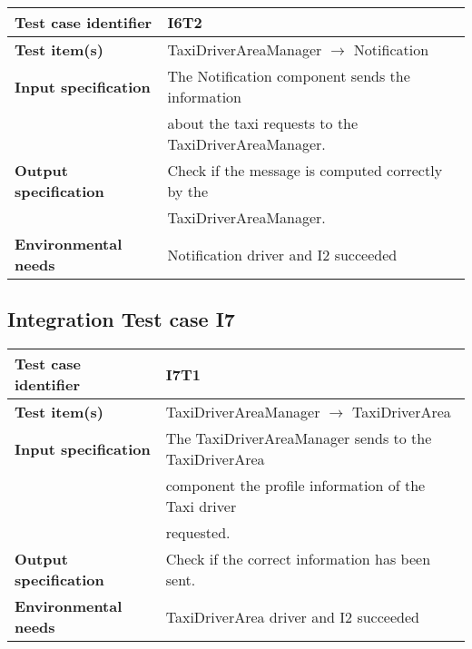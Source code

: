 		\vspace{1cm}
		\noindent
		\begin{adjustbox}{max width=\textwidth}
			\begin{tabular}{ l l}
				\hline 		\textbf{Test case identifier} & I6T2 \\
				\hline		\textbf{Test item(s)} & TaxiDriverAreaManager $\rightarrow$ Notification \\
				\hline		\textbf{Input specification} & The Notification component sends the information\\& about the taxi requests to the TaxiDriverAreaManager.\\
				\hline		\textbf{Output specification} & Check if the message is computed correctly by the\\ & TaxiDriverAreaManager.\\
				\hline		\textbf{Environmental needs} & Notification driver and I2 succeeded\\
				\hline
			\end{tabular}
		\end{adjustbox}
	
	\hypertarget{chapter 3.7}{ }
	\subsection{Integration Test case I7}
		\begin{adjustbox}{max width=\textwidth}
			\begin{tabular}{ l l}
				\hline 		\textbf{Test case identifier} & I7T1 \\
				\hline		\textbf{Test item(s)}  & TaxiDriverAreaManager $\rightarrow$ TaxiDriverArea \\
				\hline		\textbf{Input specification} & The TaxiDriverAreaManager sends to the TaxiDriverArea\\ & component the profile information of the Taxi driver\\ & requested.\\
				\hline		\textbf{Output specification} & Check if the correct information has been sent.\\
				\hline		\textbf{Environmental needs} & TaxiDriverArea driver and I2 succeeded\\
				\hline
			\end{tabular}
		\end{adjustbox}
		
